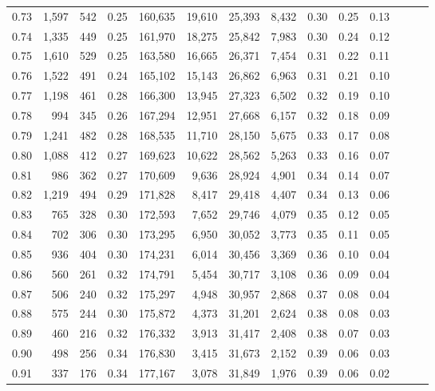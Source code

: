 \begin{tabular}{rrrrrrrrrrrrrr}
0.73 &  1,597 &  542 &  0.25 &  160,635 &   19,610 &  25,393 &   8,432 &  0.30 &  0.25 &      0.13 \\
0.74 &  1,335 &  449 &  0.25 &  161,970 &   18,275 &  25,842 &   7,983 &  0.30 &  0.24 &      0.12 \\
0.75 &  1,610 &  529 &  0.25 &  163,580 &   16,665 &  26,371 &   7,454 &  0.31 &  0.22 &      0.11 \\
0.76 &  1,522 &  491 &  0.24 &  165,102 &   15,143 &  26,862 &   6,963 &  0.31 &  0.21 &      0.10 \\
0.77 &  1,198 &  461 &  0.28 &  166,300 &   13,945 &  27,323 &   6,502 &  0.32 &  0.19 &      0.10 \\
0.78 &    994 &  345 &  0.26 &  167,294 &   12,951 &  27,668 &   6,157 &  0.32 &  0.18 &      0.09 \\
0.79 &  1,241 &  482 &  0.28 &  168,535 &   11,710 &  28,150 &   5,675 &  0.33 &  0.17 &      0.08 \\
0.80 &  1,088 &  412 &  0.27 &  169,623 &   10,622 &  28,562 &   5,263 &  0.33 &  0.16 &      0.07 \\
0.81 &    986 &  362 &  0.27 &  170,609 &    9,636 &  28,924 &   4,901 &  0.34 &  0.14 &      0.07 \\
0.82 &  1,219 &  494 &  0.29 &  171,828 &    8,417 &  29,418 &   4,407 &  0.34 &  0.13 &      0.06 \\
0.83 &    765 &  328 &  0.30 &  172,593 &    7,652 &  29,746 &   4,079 &  0.35 &  0.12 &      0.05 \\
0.84 &    702 &  306 &  0.30 &  173,295 &    6,950 &  30,052 &   3,773 &  0.35 &  0.11 &      0.05 \\
0.85 &    936 &  404 &  0.30 &  174,231 &    6,014 &  30,456 &   3,369 &  0.36 &  0.10 &      0.04 \\
0.86 &    560 &  261 &  0.32 &  174,791 &    5,454 &  30,717 &   3,108 &  0.36 &  0.09 &      0.04 \\
0.87 &    506 &  240 &  0.32 &  175,297 &    4,948 &  30,957 &   2,868 &  0.37 &  0.08 &      0.04 \\
0.88 &    575 &  244 &  0.30 &  175,872 &    4,373 &  31,201 &   2,624 &  0.38 &  0.08 &      0.03 \\
0.89 &    460 &  216 &  0.32 &  176,332 &    3,913 &  31,417 &   2,408 &  0.38 &  0.07 &      0.03 \\
0.90 &    498 &  256 &  0.34 &  176,830 &    3,415 &  31,673 &   2,152 &  0.39 &  0.06 &      0.03 \\
0.91 &    337 &  176 &  0.34 &  177,167 &    3,078 &  31,849 &   1,976 &  0.39 &  0.06 &      0.02 \\

\end{tabular}
